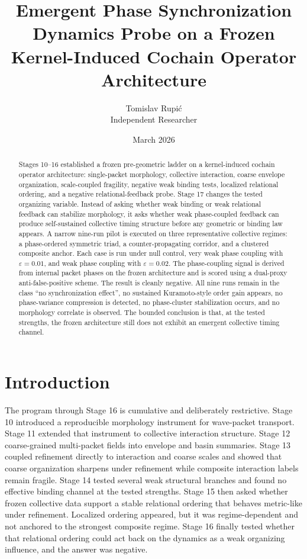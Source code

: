 \documentclass[11pt]{article}
\title{Emergent Phase Synchronization Dynamics Probe on a Frozen Kernel-Induced Cochain Operator Architecture}
\author{Tomislav Rupi\'c \\ Independent Researcher}
\date{March 2026}
\begin{document}
\maketitle

\begin{abstract}
Stages 10--16 established a frozen pre-geometric ladder on a kernel-induced cochain operator architecture: single-packet morphology, collective interaction, coarse envelope organization, scale-coupled fragility, negative weak binding tests, localized relational ordering, and a negative relational-feedback probe. Stage 17 changes the tested organizing variable. Instead of asking whether weak binding or weak relational feedback can stabilize morphology, it asks whether weak phase-coupled feedback can produce self-sustained collective timing structure before any geometric or binding law appears. A narrow nine-run pilot is executed on three representative collective regimes: a phase-ordered symmetric triad, a counter-propagating corridor, and a clustered composite anchor. Each case is run under null control, very weak phase coupling with $\varepsilon=0.01$, and weak phase coupling with $\varepsilon=0.02$. The phase-coupling signal is derived from internal packet phases on the frozen architecture and is scored using a dual-proxy anti-false-positive scheme. The result is cleanly negative. All nine runs remain in the class ``no synchronization effect'', no sustained Kuramoto-style order gain appears, no phase-variance compression is detected, no phase-cluster stabilization occurs, and no morphology correlate is observed. The bounded conclusion is that, at the tested strengths, the frozen architecture still does not exhibit an emergent collective timing channel.
\end{abstract}

\section{Introduction}

The program through Stage 16 is cumulative and deliberately restrictive. Stage 10 introduced a reproducible morphology instrument for wave-packet transport. Stage 11 extended that instrument to collective interaction structure. Stage 12 coarse-grained multi-packet fields into envelope and basin summaries. Stage 13 coupled refinement directly to interaction and coarse scales and showed that coarse organization sharpens under refinement while composite interaction labels remain fragile. Stage 14 tested several weak structural branches and found no effective binding channel at the tested strengths. Stage 15 then asked whether frozen collective data support a stable relational ordering that behaves metric-like under refinement. Localized ordering appeared, but it was regime-dependent and not anchored to the strongest composite regime. Stage 16 finally tested whether that relational ordering could act back on the dynamics as a weak organizing influence, and the answer was negative.
\end{document}
